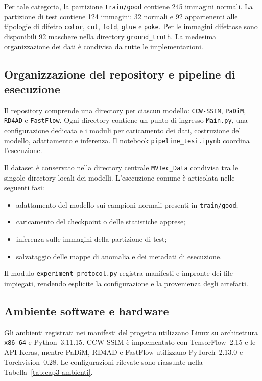 Per tale categoria, la partizione \texttt{train/good} contiene 245 immagini normali. La partizione di test contiene 124 immagini: 32 normali e 92 appartenenti alle tipologie di difetto \texttt{color}, \texttt{cut}, \texttt{fold}, \texttt{glue} e \texttt{poke}. Per le immagini difettose sono disponibili 92 maschere nella directory \texttt{ground\_truth}. La medesima organizzazione dei dati è condivisa da tutte le implementazioni.

\subsection{Organizzazione del repository e pipeline di esecuzione}

Il repository comprende una directory per ciascun modello: \texttt{CCW-SSIM}, \texttt{PaDiM}, \texttt{RD4AD} e \texttt{FastFlow}. Ogni directory contiene un punto di ingresso \texttt{Main.py}, una configurazione dedicata e i moduli per caricamento dei dati, costruzione del modello, adattamento e inferenza. Il notebook \texttt{pipeline\_tesi.ipynb} coordina l'esecuzione.

Il dataset è conservato nella directory centrale \texttt{MVTec\_Data} condivisa tra le singole directory locali dei modelli. L'esecuzione comune è articolata nelle seguenti fasi:
\begin{itemize}
    \item adattamento del modello sui campioni normali presenti in \texttt{train/good};
    \item caricamento del checkpoint o delle statistiche apprese;
    \item inferenza sulle immagini della partizione di test;
    \item salvataggio delle mappe di anomalia e dei metadati di esecuzione.
\end{itemize}

Il modulo \texttt{experiment\_protocol.py} registra manifesti e impronte dei file impiegati, rendendo esplicite la configurazione e la provenienza degli artefatti.

\subsection{Ambiente software e hardware}

Gli ambienti registrati nei manifesti del progetto utilizzano Linux su architettura \texttt{x86\_64} e Python~3.11.15. CCW-SSIM è implementato con TensorFlow~2.15 e le API Keras, mentre PaDiM, RD4AD e FastFlow utilizzano PyTorch~2.13.0 e Torchvision~0.28. Le configurazioni rilevate sono riassunte nella Tabella~\ref{tab:cap3-ambienti}.

